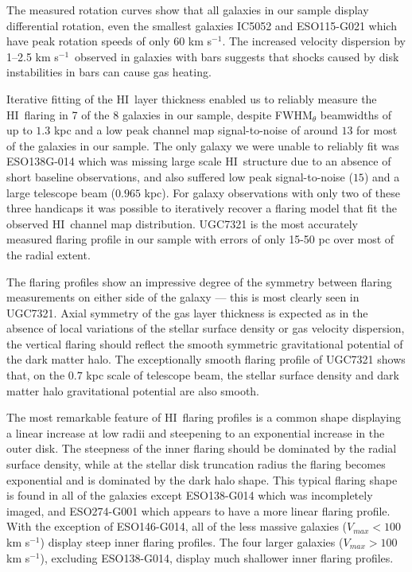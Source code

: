 \documentclass[traditabstract]{aa} %
\newcommand\HI{H{\small I}}
\newcommand\kms{km s$^{-1}$}
\begin{document}
The measured rotation curves show that all galaxies in our sample
display differential rotation, even the smallest galaxies IC5052 and
ESO115-G021 which have peak rotation speeds of only $60$ \kms. The
increased velocity dispersion by 1--2.5 \kms\ observed in galaxies
with bars suggests that shocks caused by disk instabilities in bars
can cause gas heating.

Iterative fitting of the \HI\ layer thickness enabled us to reliably
measure the \HI\ flaring in 7 of the 8 galaxies in our sample, despite
FWHM$_{\theta}$ beamwidths of up to $1.3$ kpc and a low peak channel
map signal-to-noise of around $13$ for most of the galaxies in our
sample. The only galaxy we were unable to reliably fit was ESO138G-014
which was missing large scale \HI\ structure due to an absence of short
baseline observations, and also suffered low peak signal-to-noise
($15$) and a large telescope beam ($0.965$ kpc). For galaxy
observations with only two of these three handicaps it was possible to
iteratively recover a flaring model that fit the observed \HI\ channel
map distribution. UGC7321 is the most accurately measured flaring
profile in our sample with errors of only 15-50 pc over most of the
radial extent. 

The flaring profiles show an impressive degree of the symmetry between 
flaring measurements on either side of the galaxy --- this is most clearly 
seen in UGC7321. Axial symmetry of the gas layer
thickness is expected as in the absence of local variations of the
stellar surface density or gas velocity dispersion, the vertical
flaring should reflect the smooth symmetric gravitational potential of
the dark matter halo. The exceptionally smooth flaring profile of
UGC7321 shows that, on the $0.7$ kpc scale of telescope beam, the
stellar surface density and dark matter halo gravitational potential
are also smooth.

The most remarkable feature of \HI\ flaring
profiles is a common shape displaying a linear
increase at low radii and steepening to an exponential increase in the
outer disk. The steepness of the inner flaring should be dominated by
the radial surface density, while at the stellar disk truncation
radius the flaring becomes exponential and is dominated by the dark
halo shape. This typical flaring shape is found in all of the galaxies
except ESO138-G014 which was incompletely imaged, and ESO274-G001
which appears to have a more linear flaring profile. With the
exception of ESO146-G014, all of the less massive galaxies ($V_{max} <
100$ \kms) display steep inner flaring profiles.  The four larger
galaxies ($V_{max} > 100$ \kms), excluding ESO138-G014, display much
shallower inner flaring profiles.
\end{document}
